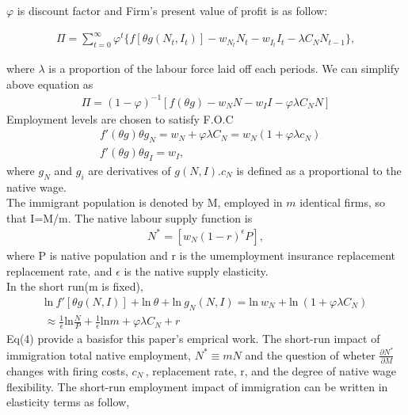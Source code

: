 \documentclass[../root]{subfiles}
\begin{document}
    $\varphi$ is discount factor and Firm's present value of profit is as follow:

    \begin{align*}
        \Pi = \sum^{\infty}_{t=0} \varphi^t \{ f[\theta g(N_t, I_t)] -w_{N_t}N_t - w_{I_t}I_t - \lambda C_N N_{t-1} \},
    \end{align*}

    where $\lambda$ is a proportion of the labour force laid off each periods.
    We can simplify above equation as
    \begin{align}
        \Pi = (1-\varphi)^{-1} [f(\theta g)-w_N N -w_I I-\varphi \lambda C_N N]
    \end{align}
    Employment levels are chosen to satisfy F.O.C
    \begin{subequations}
        \begin{align}
            &f'(\theta g)\theta g_N =w_N + \varphi \lambda C_N=w_N(1+\varphi \lambda c_N) \\
            &f'(\theta g)\theta g_I=w_I,
        \end{align}
    \end{subequations}
    where $g_N$ and $g_i$ are derivatives of $g(N,I)$.$c_N$ is defined as a proportional to the native wage. \\
    The immigrant population is denoted by M, employed in $m$ identical firms, so that I=M/m.
    The native labour supply function is 
    \begin{align}
        N^*=[w_N (1-r)^{\epsilon}P],
    \end{align}
    where P is native population and r is the umemployment insurance replacement replacement rate, and $\epsilon$ is the native supply elasticity. \\
    In the short run(m is fixed), 
    \begin{align}
        \mbox{ln} \ f'[\theta g(N,I)] +\mbox{ln}\ \theta +\mbox{ln}\ g_N(N,I)= \mbox{ln} \ w_N +\mbox{ln} \ (1+\varphi \lambda C_N) \nonumber \\
        \approx \frac{1}{\epsilon} \mbox{ln}\frac{N}{P}+\frac{1}{\epsilon} \mbox{ln}m + \varphi \lambda C_N + r 
    \end{align}
    Eq(4) provide a basisfor this paper's emprical work.
    The short-run impact of immigration total native employment, $N^*\equiv mN$ and  the question of wheter $\frac{\partial N^*}{\partial M}$ changes with firing costs, $c_{N^{\cdot}}$, replacement rate, r, and the degree of native wage flexibility.
    The short-run employment impact of immigration can be written in elasticity terms as follow,
\end{document}
